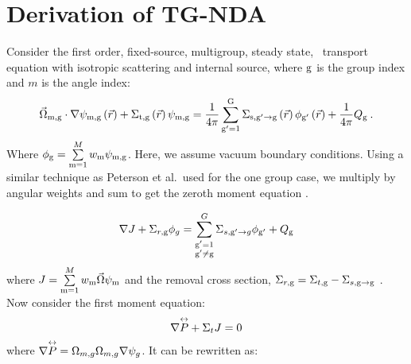 
\section{Derivation of TG-NDA}
Consider the first order, fixed-source, multigroup, steady state, \sn\ transport equation with isotropic scattering and internal source, where $\mathrm{g}$ is the group index and $m$ is the angle index:
  \begin{equation}
  \vec{\Omega}_{\mathrm{m},\mathrm{g}}\cdot \nabla \psi_{\mathrm{m},\mathrm{g}} \left(\vec{r}\right)+ \Sigma_{\mathrm{t},\mathrm{g}}\left(\vec{r}\right)\psi_{\mathrm{m},\mathrm{g}} = \frac{1}{4 \pi} \sum\limits_{\mathrm{g}'=1}^{\mathrm{G}} \Sigma_{\mathrm{s},{\mathrm{g}'}\to\mathrm{g}}\left(\vec{r}\right) \phi_{\mathrm{g}'}\left(\vec{r}\right) + \frac{1}{4 \pi} Q_{\mathrm{g}}\:.
  \end{equation}
  Where $\phi_{\mathrm{g}} = \sum\limits_{\mathrm{m}=1}^M w_{\mathrm{m}} \psi_{\mathrm{m}, \mathrm{g}}$. Here, we assume vacuum boundary conditions. Using a similar technique as Peterson et al.\ used for the one group case, we multiply by angular weights and sum to get the zeroth moment equation \cite{morel-holo}.

  \begin{equation}
  \nabla J + \Sigma_{r,\mathrm{g}}\phi_g  = \sum_{\substack{\mathrm{g}'=1 \\ \mathrm{g}' \neq \mathrm{g}}}^G \Sigma_{s,\mathrm{g}' \rightarrow g}\phi_{\mathrm{g}'} + Q_{\mathrm{g}}
  \label{eq:zeroth_moment}
  \end{equation}
where $J = \sum\limits_{\mathrm{m}=1}^{M}w_{\mathrm{m}} \vec{\Omega}\psi_{\mathrm{m}}$ and the removal cross section, $\Sigma_{r, \mathrm{g}} = \Sigma_{t, \mathrm{g}} - \Sigma_{s, \mathrm{g} \rightarrow \mathrm{g}}$ . 
  Now consider the first moment equation:
  \begin{equation}
  \nabla \overset{\text{\scriptsize$\leftrightarrow$}}{P} + \Sigma_t J = 0
  \end{equation}
where $\nabla \overset{\text{\scriptsize$\leftrightarrow$}}{P} =  \Omega_{m,g} \Omega_{m,g} \nabla \psi_{g}$. It can be rewritten as: 

